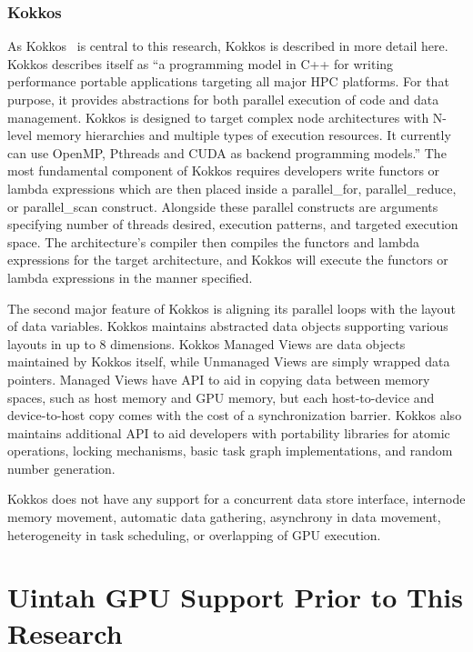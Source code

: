 \documentclass[12pt]{article}
\begin{document}
\subsubsection{Kokkos}
\label{ch:Kokkos}
As Kokkos~\cite{kokkos2012} is central to this research, Kokkos is described in more detail here.  Kokkos describes itself as “a programming model in C++ for writing performance portable applications targeting all major HPC platforms. For that purpose, it provides abstractions for both parallel execution of code and data management. Kokkos is designed to target complex node architectures with N-level memory hierarchies and multiple types of execution resources. It currently can use OpenMP, Pthreads and CUDA as backend programming models.”  The most fundamental component of Kokkos requires developers write functors or lambda expressions which are then placed inside a parallel\_for, parallel\_reduce, or parallel\_scan construct.  Alongside these parallel constructs are arguments specifying number of threads desired, execution patterns, and targeted execution space.  The architecture’s compiler then compiles the functors and lambda expressions for the target architecture, and Kokkos will execute the functors or lambda expressions in the manner specified.  

The second major feature of Kokkos is aligning its parallel loops with the layout of data variables.  Kokkos maintains abstracted data objects supporting various layouts in up to 8 dimensions.   Kokkos Managed Views are data objects maintained by Kokkos itself, while Unmanaged Views are simply wrapped data pointers.  Managed Views have API to aid in copying data between memory spaces, such as host memory and GPU memory, but each host-to-device and device-to-host copy comes with the cost of a synchronization barrier.  Kokkos also maintains additional API to aid developers with portability libraries for atomic operations, locking mechanisms, basic task graph implementations, and random number generation.


  
Kokkos does not have any support for a concurrent data store interface, internode memory movement, automatic data gathering, asynchrony in data movement, heterogeneity in task scheduling, or overlapping of GPU execution.



\section{Uintah GPU Support Prior to This Research}
\label{ch:uintah_prior}
\end{document}

